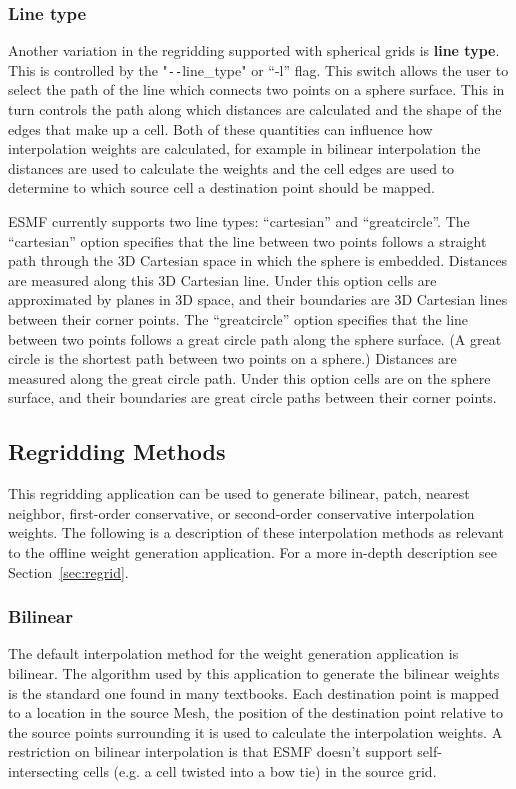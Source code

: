 \subsubsection{Line type}\label{sec:rwg_linetype}
 Another variation in the regridding supported with spherical grids is {\bf line type}. This is controlled by the "\verb+--+line\_type" or ``-l'' flag. This switch allows the user to select the path of the line which connects
two points on a sphere surface. This in turn controls the path along which distances are calculated and the shape of 
the edges that make up a cell. Both of these quantities can influence how interpolation weights are calculated, for example in
bilinear interpolation the distances are used to calculate the weights and the cell edges are used to determine to which source 
cell a destination point should be mapped. 

ESMF currently supports two line types: ``cartesian'' and ``greatcircle''. The ``cartesian'' option 
specifies that the line between two points follows a straight path through the 3D Cartesian space in which the sphere is embedded.
Distances are measured along  this 3D Cartesian line. Under this option cells are approximated by planes in 3D space, and their boundaries are 
3D Cartesian lines between their corner points.  The ``greatcircle'' option specifies that the line between two points follows
a great circle path along the sphere surface. (A great circle is the shortest path between two points on a sphere.) 
Distances are measured along the great circle path. Under this option cells are on the sphere surface, and their boundaries 
are great circle paths between their corner points. 


\subsection{Regridding Methods}\label{sec:rwg_regridmethods}
 This regridding application can be used to generate bilinear, patch, nearest neighbor, first-order conservative, or second-order conservative 
interpolation weights. The following is a description of these interpolation methods as relevant to the offline weight generation application. For a more in-depth description see Section~\ref{sec:regrid}.

\subsubsection{Bilinear}\label{sec:rwg_bilinear}
 The default interpolation method for the weight generation application is bilinear. The algorithm used by this application to 
generate the bilinear weights is the standard one found in many textbooks.  Each destination point is mapped to a location
in the source Mesh, the position of the destination point relative to the source points surrounding it is used to calculate the interpolation weights. A restriction on
bilinear interpolation is that ESMF doesn't support self-intersecting cells (e.g. a cell twisted into a bow tie) in the source grid.


